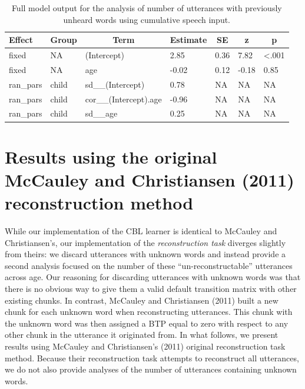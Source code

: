 \documentclass[
  english,
  man,floatsintext]{apa6}
\begin{document}
\begin{table}[tbp]

\begin{center}
\begin{threeparttable}

\caption{\label{tab:tab-unseen_words-cumu-MAIN}Full model output for the analysis of number of utterances with previously unheard words using cumulative speech input.}

\begin{tabular}{lllllll}
\toprule
Effect & \multicolumn{1}{c}{Group} & \multicolumn{1}{c}{Term} & \multicolumn{1}{c}{Estimate} & \multicolumn{1}{c}{SE} & \multicolumn{1}{c}{z} & \multicolumn{1}{c}{p}\\
\midrule
fixed & NA & (Intercept) & 2.85 & 0.36 & 7.82 & <.001\\
fixed & NA & age & -0.02 & 0.12 & -0.18 & 0.85\\
ran\_pars & child & sd\_\_(Intercept) & 0.78 & NA & NA & NA\\
ran\_pars & child & cor\_\_(Intercept).age & -0.96 & NA & NA & NA\\
ran\_pars & child & sd\_\_age & 0.25 & NA & NA & NA\\
\bottomrule
\end{tabular}

\end{threeparttable}
\end{center}

\end{table}

\pagebreak

\hypertarget{results-using-the-original-mccauley-and-christiansen-2011-reconstruction-method}{%
\section{Results using the original McCauley and Christiansen (2011) reconstruction method}\label{results-using-the-original-mccauley-and-christiansen-2011-reconstruction-method}}

While our implementation of the CBL learner is identical to McCauley and Christiansen's, our implementation of the \emph{reconstruction task} diverges slightly from theirs: we discard utterances with unknown words and instead provide a second analysis focused on the number of these \enquote{un-reconstructable} utterances across age. Our reasoning for discarding utterances with unknown words was that there is no obvious way to give them a valid default transition matrix with other existing chunks. In contrast, McCauley and Christiansen (2011) built a new chunk for each unknown word when reconstructing utterances. This chunk with the unknown word was then assigned a BTP equal to zero with respect to any other chunk in the utterance it originated from. In what follows, we present results using McCauley and Christiansen's (2011) original reconstruction task method. Because their reconstruction task attempts to reconstruct all utterances, we do not also provide analyses of the number of utterances containing unknown words.
\end{document}
